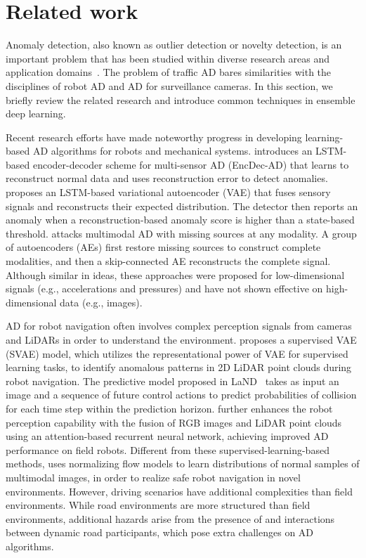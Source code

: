 \section{Related work}
\label{sec:related_work}
Anomaly detection, also known as outlier detection or novelty detection, is an important problem that has been studied within diverse research areas and application domains~\citep{chandola2009anomaly,chalapathy2019deep}. The problem of traffic AD bares similarities with the disciplines of robot AD and AD for surveillance cameras. In this section, we briefly review the related research and introduce common techniques in ensemble deep learning.

Recent research efforts have made noteworthy progress in developing learning-based AD algorithms for robots and mechanical systems. \cite{malhotra2016lstm} introduces an LSTM-based encoder-decoder scheme for multi-sensor AD (EncDec-AD) that learns to reconstruct normal data and uses reconstruction error to detect anomalies. \cite{park2018multimodal} proposes an LSTM-based variational autoencoder (VAE) that fuses sensory signals and reconstructs their expected distribution. The detector then reports an anomaly when a reconstruction-based anomaly score is higher than a state-based threshold. \cite{feng2022unsupervised} attacks multimodal AD with missing sources at any modality. A group of autoencoders (AEs) first restore missing sources to construct complete modalities, and then a skip-connected AE reconstructs the complete signal. Although similar in ideas, these approaches were proposed for low-dimensional signals (e.g., accelerations and pressures) and have not shown effective on high-dimensional data (e.g., images).

AD for robot navigation often involves complex perception signals from cameras and LiDARs in order to understand the environment. \cite{ji2020multi} proposes a supervised VAE (SVAE) model, which utilizes the representational power of VAE for supervised learning tasks, to identify anomalous patterns in 2D LiDAR point clouds during robot navigation. The predictive model proposed in LaND~\citep{kahn2021land} takes as input an image and a sequence of future control actions to predict probabilities of collision for each time step within the prediction horizon. \cite{schreiber2023attentional} further enhances the robot perception capability with the fusion of RGB images and LiDAR point clouds using an attention-based recurrent neural network, achieving improved AD performance on field robots. Different from these supervised-learning-based methods, \cite{wellhausen2020safe} uses normalizing flow models to learn distributions of normal samples of multimodal images, in order to realize safe robot navigation in novel environments. However, driving scenarios have additional complexities than field environments. While road environments are more structured than field environments, additional hazards arise from the presence of and interactions between dynamic road participants, which pose extra challenges on AD algorithms.

